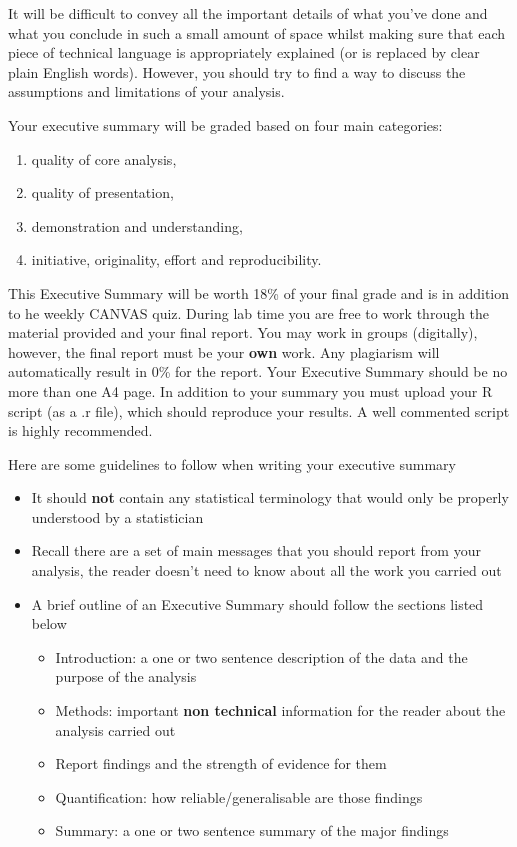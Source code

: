 \documentclass{article}
\begin{document}
It will be difficult to convey all the important details of what you've done and what you conclude in such
a small amount of space whilst  making sure that each piece of technical language is appropriately explained (or is replaced by clear plain English words). However, you should try to find a way to discuss the assumptions and limitations of your analysis.

Your executive summary will be  graded based on four main categories:
\begin{enumerate}
\item quality of core analysis,
\item quality of presentation,
\item demonstration and understanding,
\item initiative, originality, effort and reproducibility. 
\end{enumerate}

This Executive Summary will be worth  18\% of your final grade and is in addition to he weekly CANVAS quiz. During lab time you are free to work through the material provided and your final report. You may work in groups (digitally), however, the final report must be your \textbf{own} work. Any plagiarism will automatically result in 0\% for the report. Your Executive Summary should be no more than one A4 page. In addition to your summary you must upload your R script (as a .r file), which should reproduce your results. A well commented script is highly recommended.

Here are some guidelines to follow when writing your executive summary
\begin{itemize}
\item  It should \textbf{not} contain any statistical terminology that would only be properly understood by a statistician
  \item Recall there are a set of main messages that you should report from your analysis, the reader doesn't need to know about all the work you carried out
\item A brief outline of an Executive Summary should follow the sections listed below
  \begin{itemize}
\item Introduction: a one or two sentence description of the data and the purpose of the analysis
\item Methods: important \textbf{non technical} information for the reader about the analysis carried out
\item Report findings and the strength of evidence for them
\item Quantification: how reliable/generalisable are those findings
  \item Summary: a one or two sentence summary of the major findings
  \end{itemize}
\end{itemize}
\end{document}
